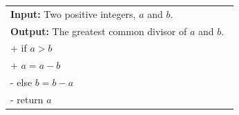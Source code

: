 \documentclass[12pt]{standalone}
\newcounter{levelstanda}
\begin{document}
\renewcommand{\arraystretch}{0}
\begin{tabular}{@{}p{0.98\linewidth}@{}}%

        \textbf{Input:}  Two positive integers, $a$ and $b$.\\
        \textbf{Output:} The greatest common divisor of $a$ and $b$.
        \begin{pseudo}[label=\small\arabic*, indent-mark]
            while $a \neq b$ \ct{If equal, both are gcd} \\+
                if $a > b$ \ct{ Reduce max with multiple of min} \\+
                    $a = a - b$ \ct{ $a$ is largest} \\-
                else $b = b - a$ \ct{ $b$ is largest} \\-
            return $a$ \ct{ Both are gcd, so return one}
        \end{pseudo}
        The running time is quadratic in the number of bits in the input.
\end{tabular}
\addtocounter{levelstanda}{-1}
\end{document}
